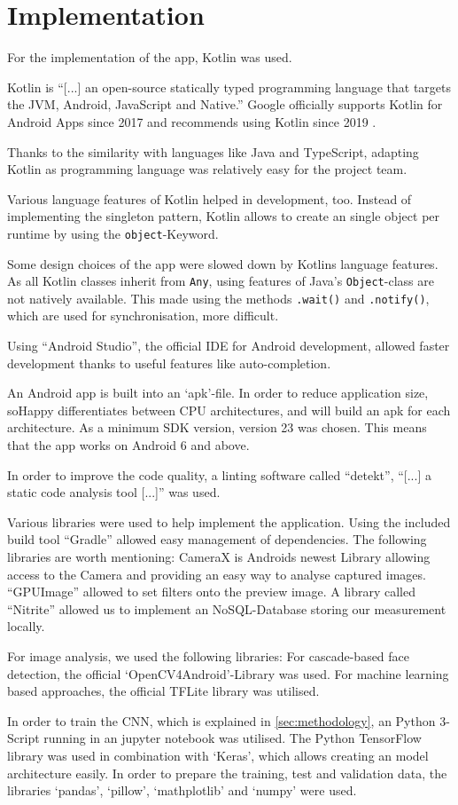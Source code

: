 \section{Implementation} \label{sec:implementation}

For the implementation of the app, Kotlin was used.

Kotlin is ``[...] an open-source statically typed programming language
that targets the JVM, Android, JavaScript and Native.'' \cite{kotlin2020}
Google officially supports Kotlin for Android Apps since 2017
\cite{googleio2017} and recommends using Kotlin since 2019
\cite{androidkotlin2019}.

Thanks to the similarity with languages like Java and TypeScript, adapting
Kotlin as programming language was relatively easy for the project team.

Various language features of Kotlin helped in development, too. Instead of
implementing the singleton pattern, Kotlin allows to create an single object
per runtime by using the \texttt{object}-Keyword.

Some design choices of the app were slowed down by Kotlins language features.
As all Kotlin classes inherit from \texttt{Any}, using features of Java's 
\texttt{Object}-class are not natively available. This made using the methods
\texttt{.wait()} and \texttt{.notify()}, which are used for synchronisation,
more difficult.

Using ``Android Studio'', the official IDE for Android development, allowed
faster development thanks to useful features like auto-completion. 

An Android app is built into an `apk'-file. In order to reduce application
size, soHappy differentiates between CPU architectures, and will
build an apk for each architecture. As a minimum SDK version, version 23
was chosen. This means that the app works on Android 6 and above.

In order to improve the code quality, a linting software called ``detekt'',
``[...] a static code analysis tool [...]''\cite{detekt2020} was used.

Various libraries were used to help implement the application. Using
the included build tool ``Gradle'' allowed easy management of dependencies.
The following libraries are worth mentioning: CameraX is Androids newest
Library allowing access to the Camera and providing an easy way to analyse 
captured images. ``GPUImage'' allowed to set filters onto the preview 
image. A library called ``Nitrite'' allowed us to implement an NoSQL-Database 
storing our measurement locally.

For image analysis, we used the following libraries: For cascade-based face
detection, the official `OpenCV4Android'-Library was used. For machine learning
based approaches, the official TFLite library was utilised.


In order to train the CNN, which is explained in \ref{sec:methodology}, an 
Python 3-Script running in an jupyter notebook was utilised. 
The Python TensorFlow library was used in combination with `Keras',
which allows creating an model architecture easily. In order to prepare the
training, test and validation data, the libraries `pandas', `pillow', 
`mathplotlib' and `numpy' were used.
